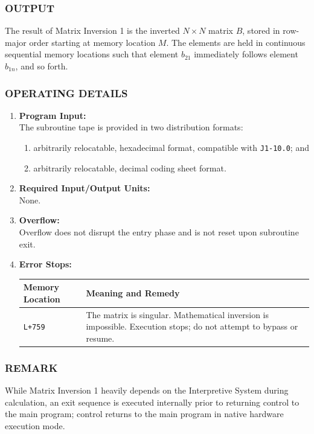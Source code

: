 \documentclass{article}
\begin{document}
\subsubsection*{OUTPUT}
The result of Matrix Inversion 1 is the inverted $N \times N$ matrix $B$, stored in row-major order starting at memory location $M$. The elements are held in continuous sequential memory locations such that element $b_{21}$ immediately follows element $b_{1n}$, and so forth.

\subsubsection*{OPERATING DETAILS}

\begin{enumerate}[leftmargin=1.5em, itemsep=6pt]
    \item \textbf{Program Input:} \\
    The subroutine tape is provided in two distribution formats:
    \begin{enumerate}[label=\alph*), itemsep=2pt, topsep=2pt]
        \item arbitrarily relocatable, hexadecimal format, compatible with \texttt{J1-10.0}; and
        \item arbitrarily relocatable, decimal coding sheet format.
    \end{enumerate}
    
    \item \textbf{Required Input/Output Units:} \\
    None.
    
    \item \textbf{Overflow:} \\
    Overflow does not disrupt the entry phase and is not reset upon subroutine exit.
    
    \item \textbf{Error Stops:} \\
    \begin{tabular}{lp{9cm}}
        \toprule
        \textbf{Memory Location} & \textbf{Meaning and Remedy} \\
        \midrule
        \texttt{L+759}           & The matrix is singular. Mathematical inversion is impossible. Execution stops; do not attempt to bypass or resume. \\
        \bottomrule
    \end{tabular}
\end{enumerate}

\subsubsection*{REMARK}
While Matrix Inversion 1 heavily depends on the Interpretive System during calculation, an exit sequence is executed internally prior to returning control to the main program; control returns to the main program in native hardware execution mode.
\end{document}
